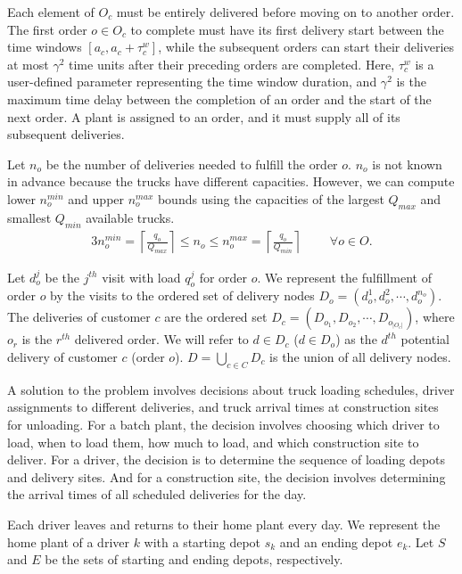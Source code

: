 \documentclass{article}
\begin{document}
Each element of $O_c$ must be entirely delivered before moving on to another order. The first order $o \in O_c$ to complete must have its first delivery start between the time windows $\left[a_c, a_c + \tau^w_c \right]$, while the subsequent orders can start their deliveries at most $\gamma^2$ time units after their preceding orders are completed. Here, $\tau^w_c$ is a user-defined parameter representing the time window duration, and $\gamma^2$ is the maximum time delay between the completion of an order and the start of the next order. A plant is assigned to an order, and it must supply all of its subsequent deliveries.

Let $n_o$ be the number of deliveries needed to fulfill the order $o$. $n_o$ is not known in advance because the trucks have different capacities. However, we can compute lower $n_o^{min}$ and upper $n_o^{max}$ bounds using the capacities of the largest $Q_{max}$ and smallest $Q_{min}$ available trucks.
\begin{alignat}{3}
    \label{mod:c0}
    n_o^{min} = \left\lceil \frac{q_o}{Q_{max}} \right\rceil \leq n_o \leq n_o^{max} = \left\lceil \frac{q_o}{Q_{min}} \right\rceil & \text{ } &
    \forall  o \in O.
\end{alignat}

Let $d^j_{o}$ be the $j^{th}$ visit with load $q^j_{o}$ for order $o$. We represent the fulfillment of order $o$ by the visits to the ordered set of delivery nodes $D_o= \left(d^1_{o},d^2_{o},\cdots, d^{n_o}_{o}\right)$. The deliveries of customer $c$ are the ordered set $D_c= (D_{o_1}, D_{o_2},\cdots,D_{o_{|O_c|}})$, where $o_r$ is the $r^{th}$ delivered order. We will refer to $d \in D_c$ ($d \in D_o$) as the $d^{th}$ potential delivery of customer $c$ (order $o$). $D=\bigcup_{c\in C} D_c$ is the union of all delivery nodes.

A solution to the problem involves decisions about truck loading schedules, driver assignments to different deliveries, and truck arrival times at construction sites for unloading. For a batch plant, the decision involves choosing which driver to load, when to load them, how much to load, and which construction site to deliver. For a driver, the decision is to determine the sequence of loading depots and delivery sites. And for a construction site, the decision involves determining the arrival times of all scheduled deliveries for the day.

Each driver leaves and returns to their home plant every day. We represent the home plant of a driver $k$ with a starting depot $s_k$ and an ending depot $e_k$. Let $S$ and $E$ be the sets of starting and ending depots, respectively.
\end{document}
